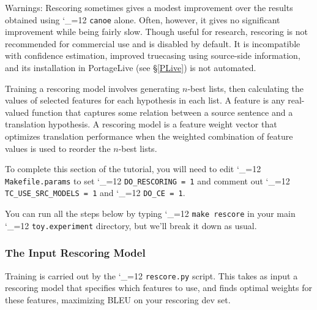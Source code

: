 \documentclass[11pt,letterpaper]{article}
\def\code{\begingroup\catcode`\_=12 \codex}
\newcommand{\codex}[1]{\texttt{#1}\endgroup}
\begin{document}
Warnings: Rescoring sometimes gives
a modest improvement over the results obtained using \code{canoe} alone. Often,
however, it gives no significant improvement while being fairly slow.
Though useful for research, rescoring is not recommended for
commercial use and is disabled by default. It is
incompatible with confidence estimation, improved truecasing using source-side
information, and its installation in PortageLive (see \S\ref{PLive}) is not
automated.

Training a rescoring model involves generating $n$-best lists, then calculating
the values of selected features for each hypothesis in each list. A
feature is any real-valued function that captures some relation
between a source sentence and a translation hypothesis. A rescoring model
is a feature weight vector that optimizes translation
performance when the weighted combination of feature values is used to reorder
the $n$-best lists.

To complete this section of the tutorial, you will need to
edit \code{Makefile.params} to set \code{DO_RESCORING = 1} and comment out
\code{TC_USE_SRC_MODELS = 1} and \code{DO_CE = 1}.

You can run all the steps below by typing \code{make rescore}
in your main \code{toy.experiment} directory, but we'll break it down as
usual.

\subsubsection{The Input Rescoring Model}

Training is carried out by the \code{rescore.py} script. This takes as input a
rescoring model that specifies which features to use, and finds optimal
weights for these features, maximizing BLEU on your rescoring dev set.
\end{document}
